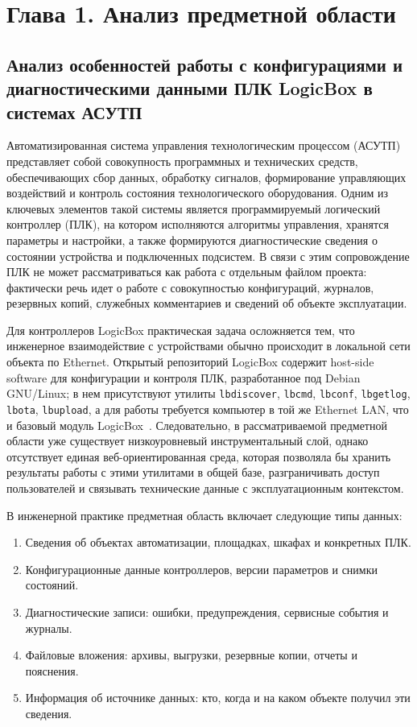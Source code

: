 \section*{Глава 1. Анализ предметной области}

\subsection{Анализ особенностей работы с конфигурациями и диагностическими данными ПЛК LogicBox в системах АСУТП}

Автоматизированная система управления технологическим процессом (АСУТП)
представляет собой совокупность программных и технических средств,
обеспечивающих сбор данных, обработку сигналов, формирование управляющих
воздействий и контроль состояния технологического оборудования. Одним из
ключевых элементов такой системы является программируемый логический
контроллер (ПЛК), на котором исполняются алгоритмы управления, хранятся
параметры и настройки, а также формируются диагностические сведения о состоянии
устройства и подключенных подсистем. В связи с этим сопровождение ПЛК не может
рассматриваться как работа с отдельным файлом проекта: фактически речь идет о
работе с совокупностью конфигураций, журналов, резервных копий, служебных
комментариев и сведений об объекте эксплуатации.

Для контроллеров LogicBox практическая задача осложняется тем, что инженерное
взаимодействие с устройствами обычно происходит в локальной сети объекта по
Ethernet. Открытый репозиторий LogicBox содержит host-side software для
конфигурации и контроля ПЛК, разработанное под Debian GNU/Linux; в нем
присутствуют утилиты \texttt{lbdiscover}, \texttt{lbcmd}, \texttt{lbconf},
\texttt{lbgetlog}, \texttt{lbota}, \texttt{lbupload}, а для работы требуется
компьютер в той же Ethernet LAN, что и базовый модуль LogicBox~\cite{logicbox_repo}.
Следовательно, в рассматриваемой предметной области уже существует низкоуровневый
инструментальный слой, однако отсутствует единая веб-ориентированная среда,
которая позволяла бы хранить результаты работы с этими утилитами в общей базе,
разграничивать доступ пользователей и связывать технические данные с
эксплуатационным контекстом.

В инженерной практике предметная область включает следующие типы данных:
\begin{enumerate}
    \item Сведения об объектах автоматизации, площадках, шкафах и конкретных ПЛК.
    \item Конфигурационные данные контроллеров, версии параметров и снимки состояний.
    \item Диагностические записи: ошибки, предупреждения, сервисные события и журналы.
    \item Файловые вложения: архивы, выгрузки, резервные копии, отчеты и пояснения.
    \item Информация об источнике данных: кто, когда и на каком объекте получил эти сведения.
\end{enumerate}

